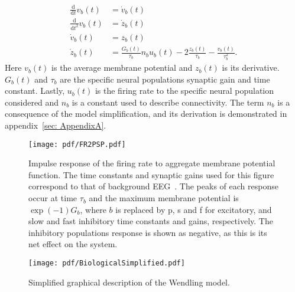 \begin{align}
\label{eqn: dummy1}
\frac{\mathrm{d}}{\mathrm{d}t}v_{b}(t) &= \dot{v}_{b}(t)\\
\label{eqn: dummy2}
\frac{\mathrm{d}}{\mathrm{d}t^2}v_{b}(t) &= \dot{z}_{b}(t)\\
\label{eqn: FR2PSP1}
\dot{v}_{b}(t)&= z_{b}(t)\\
\label{eqn: FR2PSP2}
\dot{z}_{b}(t)&=\frac{G_{b}(t)}{\tau_{b}}n_{b}u_{b}(t)-2\frac{z_{b}(t)}{\tau_{b}}-\frac{v_{b}(t)}{\tau_{b}^{2}}.
\end{align} Here $v_{b}(t)$ is the average membrane potential and $z_{b}(t)$ is its derivative. $G_{b}(t)$ and $\tau_{b}$ are the specific neural populations synaptic gain and time constant. Lastly, $u_{b}(t)$ is the firing rate to the specific neural population considered and $n_{b}$ is a constant used to describe connectivity. The term $n_{b}$ is a consequence of the model simplification, and its derivation is demonstrated in appendix~\ref{sec: AppendixA}.

\begin{figure}%
	\centering
		\texttt{[image: pdf/FR2PSP.pdf]}
	\caption{Impulse response of the firing rate to aggregate membrane potential function. The time constants and synaptic gains used for this figure correspond to that of background EEG~\citep{wendling2002epileptic}. The peaks of each response occur at time $\tau_{b}$ and the maximum membrane potential is $\exp(-1)G_{b}$, where $b$ is replaced by p, s and f for excitatory, and slow and fast inhibitory time constants and gains, respectively. The inhibitory populations response is shown as negative, as this is its net effect on the system.}
	\label{fig: FR2PSP_final}
\end{figure} %
\begin{figure}
\centering
\texttt{[image: pdf/BiologicalSimplified.pdf]}
\caption{Simplified graphical description of the Wendling model.}
\label{fig: BiologicalSimplified}
\end{figure}

